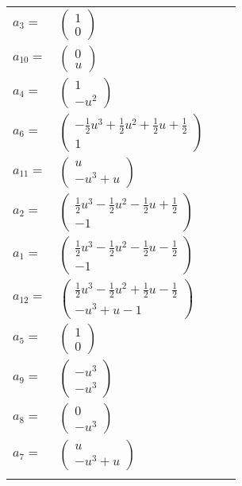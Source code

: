 \documentclass[1p]{elsarticle_modified}
\theoremstyle{definition}
\begin{document}
\begin{tabular}{m{7pt} m{180pt} m{7pt} m{180pt} }
\flushright $a_{3}=$&$\begin{pmatrix}1\\0\end{pmatrix}$ \\
\flushright $a_{10}=$&$\begin{pmatrix}0\\u\end{pmatrix}$ \\
\flushright $a_{4}=$&$\begin{pmatrix}1\\- u^2\end{pmatrix}$ \\
\flushright $a_{6}=$&$\begin{pmatrix}-\frac{1}{2} u^3+\frac{1}{2} u^2+\frac{1}{2} u+\frac{1}{2}\\1\end{pmatrix}$ \\
\flushright $a_{11}=$&$\begin{pmatrix}u\\- u^3+u\end{pmatrix}$ \\
\flushright $a_{2}=$&$\begin{pmatrix}\frac{1}{2} u^3-\frac{1}{2} u^2-\frac{1}{2} u+\frac{1}{2}\\-1\end{pmatrix}$ \\
\flushright $a_{1}=$&$\begin{pmatrix}\frac{1}{2} u^3-\frac{1}{2} u^2-\frac{1}{2} u-\frac{1}{2}\\-1\end{pmatrix}$ \\
\flushright $a_{12}=$&$\begin{pmatrix}\frac{1}{2} u^3-\frac{1}{2} u^2+\frac{1}{2} u-\frac{1}{2}\\- u^3+u-1\end{pmatrix}$ \\
\flushright $a_{5}=$&$\begin{pmatrix}1\\0\end{pmatrix}$ \\
\flushright $a_{9}=$&$\begin{pmatrix}- u^3\\- u^3\end{pmatrix}$ \\
\flushright $a_{8}=$&$\begin{pmatrix}0\\- u^3\end{pmatrix}$ \\
\flushright $a_{7}=$&$\begin{pmatrix}u\\- u^3+u\end{pmatrix}$\\&\end{tabular}
\end{document}
